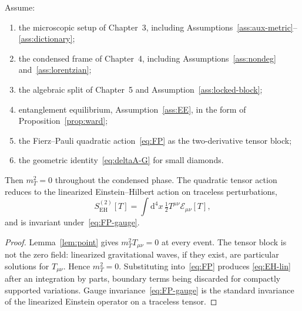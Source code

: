 \begin{theorem}
  \label{thm:mT}
  Assume:
  \begin{enumerate}
    \item the microscopic setup of Chapter~3, including
          Assumptions~\ref{ass:aux-metric}--\ref{ass:dictionary};
    \item the condensed frame of Chapter~4, including
          Assumptions~\ref{ass:nondeg} and~\ref{ass:lorentzian};
    \item the algebraic split of Chapter~5 and
          Assumption~\ref{ass:locked-block};
    \item entanglement equilibrium, Assumption~\ref{ass:EE}, in the
          form of Proposition~\ref{prop:ward};
    \item the Fierz--Pauli quadratic action~\eqref{eq:FP} as the
          two-derivative tensor block;
    \item the geometric identity~\eqref{eq:deltaA-G} for small
          diamonds.
  \end{enumerate}
  Then \(m_T^2=0\) throughout the condensed phase. The quadratic
  tensor action reduces to the linearized Einstein--Hilbert action
  on traceless perturbations,
  \begin{equation}
    \label{eq:EH-lin}
    S_{\mathrm{EH}}^{(2)}[T]
    =\int\mathrm{d}^4x\,
     \tfrac12 T^{\mu\nu}\mathcal{E}_{\mu\nu}[T],
  \end{equation}
  and is invariant under~\eqref{eq:FP-gauge}.
\end{theorem}

\begin{proof}
  Lemma~\ref{lem:point} gives \(m_T^2 T_{\mu\nu}=0\) at every event.
  The tensor block is not the zero field: linearized gravitational
  waves, if they exist, are particular solutions for \(T_{\mu\nu}\).
  Hence \(m_T^2=0\). Substituting into~\eqref{eq:FP} produces
  \eqref{eq:EH-lin} after an integration by parts, boundary terms
  being discarded for compactly supported variations. Gauge
  invariance~\eqref{eq:FP-gauge} is the standard invariance of the
  linearized Einstein operator on a traceless tensor.
\end{proof}

